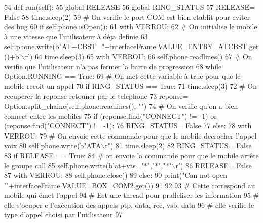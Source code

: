 \begin{DoxyCode}
54     \textcolor{keyword}{def }run(self):
55         \textcolor{keyword}{global} RELEASE
56         \textcolor{keyword}{global} RING\_STATUS
57         RELEASE= \textcolor{keyword}{False}
58         time.sleep(2)
59         \textcolor{comment}{# On verifie le port COM est bien etablit pour eviter des bug
}
60         \textcolor{keywordflow}{if} self.phone.isOpen():
61             with VERROU:
62                 \textcolor{comment}{# On initialise le mobile à une vitesse que l'utilisateur à déja definie
}
63                 self.phone.write(b\textcolor{stringliteral}{"AT+CBST="}+interfaceFrame.VALUE\_ENTRY\_ATCBST.get()+b\textcolor{stringliteral}{'\(\backslash\)r'})
64             time.sleep(3)
65             with VERROU:
66                 self.phone.readlines()
67             \textcolor{comment}{# On verifie que l'utilisateur n'a pas fermer la barre de progression
}
68             \textcolor{keywordflow}{while} Option.RUNNING == \textcolor{keyword}{True}:
69                 \textcolor{comment}{# On met cette variable à true pour que le mobile recoit un appel
}
70                 \textcolor{keywordflow}{if} RING\_STATUS == \textcolor{keyword}{True}:
71                     time.sleep(3)
72                     \textcolor{comment}{# On recuperer la reponse retouner par le telephone
}
73                     reponse= Option.split\_chaine(self.phone.readlines(), \textcolor{stringliteral}{""})
74                     \textcolor{comment}{# On verifie qu'on a bien connect entre les mobiles
}
75                     \textcolor{keywordflow}{if} (reponse.find(\textcolor{stringliteral}{"CONNECT"}) != -1) \textcolor{keywordflow}{or} (reponse.find(\textcolor{stringliteral}{"CONNECT"}) != -1):
76                         RING\_STATUS= \textcolor{keyword}{False}
77                     \textcolor{keywordflow}{else}:
78                         with VERROU:
79                             \textcolor{comment}{# On envoie cette commande pour que le mobile decrocher l'appel voix
}
80                             self.phone.write(b\textcolor{stringliteral}{"ATA\(\backslash\)r"})
81                             time.sleep(2)
82                         RING\_STATUS= \textcolor{keyword}{False}
83                 \textcolor{keywordflow}{if} RELEASE == \textcolor{keyword}{True}:
84                     \textcolor{comment}{# on envoie la commande pour que le mobile arrête le groupe call
}
85                     self.phone.write(b\textcolor{stringliteral}{'at+vts="*","*","*"\(\backslash\)r'})
86                     RELEASE= \textcolor{keyword}{False}
87             with VERROU:
88                 self.phone.close()
89         \textcolor{keywordflow}{else}:
90             print(\textcolor{stringliteral}{"Can not open '"}+interfaceFrame.VALUE\_BOX\_COM2.get())
91 
92 
93 \textcolor{comment}{# Cette correspond au mobile qui émet l'appel
}
94 \textcolor{comment}{# Est une thread pour pralleliser les information 
}
95 \textcolor{comment}{# elle s'ocuper e l'exécution des appels ptp, data, rec, vsb, data
}
96 \textcolor{comment}{# elle verifie le type d'appel choisi par l'utilisateur
}
97 
\end{DoxyCode}


